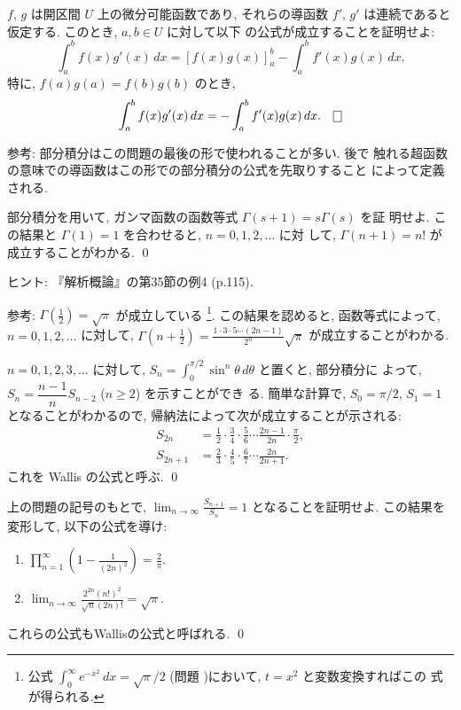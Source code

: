 \documentclass[12pt,twoside]{jarticle}
\begin{document}
\begin{question}
  $f$, $g$ は開区間 $U$ 上の微分可能函数であり, それらの導函数 %
  $f'$, $g'$ は連続であると仮定する. このとき, $a,b\in U$ に対して以下
  の公式が成立することを証明せよ:
  \[
    \int_a^b f(x)g'(x)\,dx
    = \left[ f(x)g(x) \right]_a^b - \int_a^b f'(x)g(x)\,dx.
  \]
  特に, $f(a)g(a) = f(b)g(b)$ のとき,
  \[
    \int_a^b f(x)g'(x)\,dx = - \int_a^b f'(x)g(x)\,dx.
    \qed
  \]
\end{question}

\noindent 参考: 部分積分はこの問題の最後の形で使われることが多い. 後で
触れる超函数の意味での導函数はこの形での部分積分の公式を先取りすること
によって定義される.

\begin{question}[ガンマ函数の函数等式]
  部分積分を用いて, ガンマ函数の函数等式 $\Gamma(s+1)=s\Gamma(s)$ を証
  明せよ. この結果と $\Gamma(1)=1$ を合わせると, $n=0,1,2,\ldots$ に対
  して, $\Gamma(n+1)=n!$ が成立することがわかる. \qed
\end{question}

\noindent ヒント: 『解析概論』の第35節の例4 (p.115).

\noindent 参考: $\Gamma(\frac{1}{2})=\sqrt{\pi}$ が成立している%
\footnote{公式 $\int_0^\infty e^{-x^2}\,dx=\sqrt{\pi}/2$ (問題 %
  )において, $t = x^2$ と変数変換すればこの
  式が得られる.}. %
この結果を認めると, 函数等式によって, $n=0,1,2,\ldots$ に対して, %
\(
  \Gamma\left( n + \frac{1}{2} \right)
  = \frac{1 \cdot 3 \cdot 5 \cdots (2n - 1)}{2^n} \sqrt{\pi}
\) %
が成立することがわかる.

\begin{question}[Wallisの公式1]
  $n=0,1,2,3,\ldots$ に対して, %
  $S_n = \int_0^{\pi/2} \sin^n \theta \,d\theta$ と置くと, 部分積分に
  よって, $S_n = \dfrac{n-1}{n} S_{n-2}$ ($n \ge 2$) を示すことができ
  る. 簡単な計算で, $S_0 = \pi/2$, $S_1 = 1$ となることがわかるので, 
  帰納法によって次が成立することが示される:
  \begin{align*}
    S_{2n}
    &
    =
    \frac{1}{2} \cdot \frac{3}{4} \cdot \frac{5}{6} \cdots \frac{2n-1}{2n}
    \cdot \frac{\pi}{2},
    \\
    S_{2n+1}
    &
    =
    \frac{2}{3} \cdot \frac{4}{5} \cdot \frac{6}{7} \cdots \frac{2n}{2n+1}.
  \end{align*}
  これを Wallis の公式と呼ぶ. \qed
\end{question}

\begin{question}[Wallisの公式2]\qstar{*}
  上の問題の記号のもとで, %
  $\displaystyle \lim_{n\to\infty} \frac{S_{n+1}}{S_n} = 1$ %
  となることを証明せよ. この結果を変形して, 以下の公式を導け:
  \begin{enumerate}
  \item \( \displaystyle
    \prod_{n=1}^\infty \left(1 - \frac{1}{(2n)^2} \right)
    = \frac{2}{\pi}
    \).
  \item \( \displaystyle
    \lim_{n\to\infty} \frac{2^{2n}(n!)^2}{\sqrt{n}(2n)!} = \sqrt{\pi}
    \).
  \end{enumerate}
  これらの公式もWallisの公式と呼ばれる. \qed
\end{question}
\end{document}
